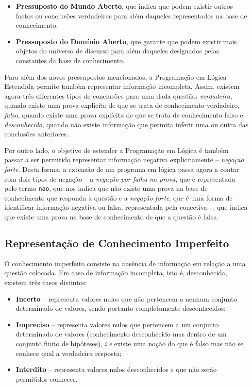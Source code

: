 \documentclass[a4paper, 11pt]{article}
\begin{document}
\begin{itemize}
    \item \textbf{Pressuposto do Mundo Aberto}, que indica que podem existir outros factos ou 
conclusões verdadeiras para além daqueles representados na base de conhecimento;
    \item \textbf{Pressuposto do Domínio Aberto}, que garante que podem existir mais objetos do 
universo de discurso para além daqueles designados pelas constantes da base de conhecimento.
\end{itemize}

Para além dos novos pressupostos mencionados, a Programação em Lógica
Estendida permite também representar informação incompleta. Assim,
existem agora três diferentes tipos de conclusões para uma dada questão: \textit{verdadeira},
quando existe uma prova explícita de que se trata de conhecimento verdadeiro, \textit{falsa},
quando existe uma prova explícita de que se trata de conhecimento falso e \textit{desconhecido},
quando não existe informação que permita inferir uma ou outra das conclusões anteriores.

Por outro lado, o objetivo de estender a
Programação em Lógica é também passar a ser permitido representar informação negativa
explicitamente -- \textit{negação forte}. Desta forma, a extensão de um programa em lógica passa
agora a contar com dois tipos de negação -- a \textit{negação por falha na prova}, que é 
representada pelo
termo \texttt{nao}, que nos indica que não existe uma prova na base de conhecimento que
responda à questão e a \textit{negação forte}, que é uma forma de identificar informação 
negativa
ou falsa, representada pela conectiva \texttt{-}, que indica que existe uma prova na base de
conhecimento de que a questão é falsa.

\subsection{Representação de Conhecimento Imperfeito}

O conhecimento imperfeito consiste na ausência de informação em relação a uma questão 
colocada. Em caso de informação incompleta, isto é, desconhecida, existem três casos distintos:

\begin{itemize}
    \item \textbf{Incerto} -- representa valores nulos que não pertencem a nenhum
    conjunto determinado de valores, sendo portanto completamente desconhecidos;
    \item \textbf{Impreciso} -- representa valores nulos que pertencem a um conjunto
    determinado de valores (conhecimento desconhecido mas dentro de um conjunto finito de 
hipóteses), \textit{i.e} existe uma noção do que é falso mas não
    se conhece qual a verdadeira resposta;
    \item \textbf{Interdito} -- representa valores nulos desconhecidos e que não serão permitidos 
conhecer.
\end{itemize}
\end{document}
